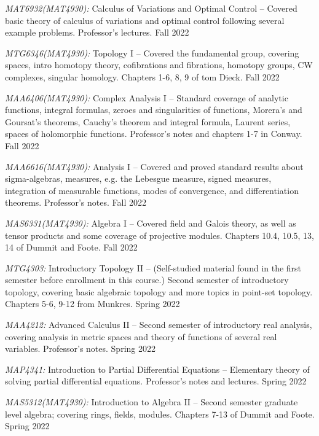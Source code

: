 \documentclass[11pt]{article}
\begin{document}
\textsl{MAT6932(MAT4930)\textsuperscript{\textdagger}:} Calculus of Variations and Optimal Control -- Covered basic theory of calculus of variations and optimal control following several example problems. Professor's lectures. Fall 2022

\textsl{MTG6346(MAT4930)\textsuperscript{\textdagger}:} Topology I -- Covered the fundamental group, covering spaces, intro homotopy theory, cofibrations and fibrations, homotopy groups, CW complexes, singular homology. Chapters 1-6, 8, 9 of tom Dieck. Fall 2022

\textsl{MAA6406(MAT4930)\textsuperscript{\textdagger}:} Complex Analysis I -- Standard coverage of analytic functions, integral formulas, zeroes and singularities of functions, Morera's and Goursat's theorems, Cauchy's theorem and integral formula, Laurent series, spaces of holomorphic functions. Professor's notes and chapters 1-7 in Conway. Fall 2022

\textsl{MAA6616(MAT4930)\textsuperscript{\textdagger}:} Analysis I -- Covered and proved standard results about sigma-algebras, measures, e.g. the Lebesgue measure, signed measures, integration of measurable functions, modes of convergence, and differentiation theorems. Professor's notes. Fall 2022

\textsl{MAS6331(MAT4930)\textsuperscript{\textdagger}:} Algebra I -- Covered field and Galois theory, as well as tensor products and some coverage of projective modules. Chapters 10.4, 10.5, 13, 14 of Dummit and Foote. Fall 2022

\textsl{MTG4303\textsuperscript{\textdagger}:} Introductory Topology II -- (Self-studied material found in the first semester before enrollment in this course.) Second semester of introductory topology, covering basic algebraic topology and more topics in point-set topology. Chapters 5-6, 9-12 from Munkres. Spring 2022

\textsl{MAA4212:} Advanced Calculus II -- Second semester of introductory real analysis, covering analysis in metric spaces and theory of functions of several real variables. Professor's notes. Spring 2022

\textsl{MAP4341\textsuperscript{\textdagger}:} Introduction to Partial Differential Equations -- Elementary theory of solving partial differential equations. Professor's notes and lectures. Spring 2022

\textsl{MAS5312(MAT4930)\textsuperscript{\textdagger}:} Introduction to Algebra II -- Second semester graduate level algebra; covering rings, fields, modules. Chapters 7-13 of Dummit and Foote. Spring 2022
\end{document}

